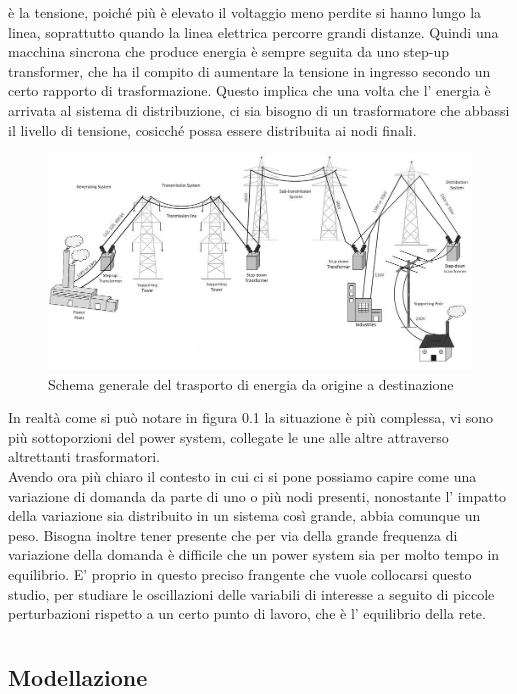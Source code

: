 \documentclass[Lau,noexaminfo]{sapthesis}
\begin{document}
	è la tensione, poiché più è elevato il voltaggio meno perdite si hanno lungo la linea, soprattutto quando la linea elettrica percorre grandi distanze. Quindi una macchina
	sincrona che produce energia è sempre seguita da uno step-up transformer, che ha il compito di aumentare la tensione in ingresso secondo un certo rapporto di trasformazione.
	Questo implica che una volta che l' energia è arrivata al sistema di distribuzione, ci sia bisogno di un trasformatore che abbassi il livello di tensione, cosicché possa essere
	distribuita ai nodi finali.
	\begin{figure}
			\centering
			\includegraphics[height=0.450\textheight,angle=90]{trasmissione}
			\caption{Schema generale del trasporto di energia da origine a destinazione}
	\end{figure}
	In realtà come si può notare in figura 0.1 la situazione è più complessa, vi sono più sottoporzioni del power system, collegate le une alle altre attraverso altrettanti trasformatori.\\
	Avendo ora più chiaro il contesto in cui ci si pone possiamo capire come una variazione di domanda da parte di uno o più nodi presenti, nonostante l' impatto della
	variazione sia distribuito in un sistema così grande, abbia comunque un peso. Bisogna inoltre tener presente che per via della grande frequenza di variazione della domanda è difficile che un power system sia per molto tempo in equilibrio. E' proprio in questo preciso frangente che vuole 
	collocarsi questo studio, per studiare le oscillazioni delle variabili di interesse a seguito di piccole perturbazioni rispetto a un certo punto di lavoro, che è l' equilibrio 
	della rete.
	\chapter{}
	\section{Modellazione}
\end{document}
